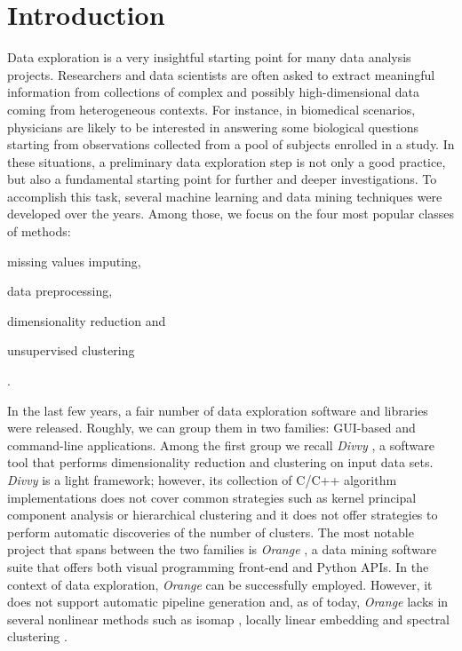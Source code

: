 \documentclass[twoside,11pt]{article}
\makeatletter
\newcommand{\py}{{Python}\@\xspace}
\makeatother
\begin{document}
\section{Introduction}\label{sec:intro}
Data exploration is a very insightful starting point for many data analysis projects. Researchers and data scientists are often asked to extract meaningful information from collections of complex and possibly high-dimensional data coming from heterogeneous contexts.
For instance, in biomedical scenarios, physicians are likely to be interested in answering some biological questions starting from observations collected from a pool of subjects enrolled in a study.
In these situations, a preliminary data exploration step is not only a good practice, but also a fundamental starting point for further and deeper investigations.
To accomplish this task, several machine learning and data mining techniques were developed over the years.
Among those, we focus on the four most popular classes of methods: \begin{enumerate*}[label=(\roman*)]
  \item missing values imputing,
  \item data preprocessing,
  \item dimensionality reduction and
  \item unsupervised clustering
\end{enumerate*}.

In the last few years, a fair number of data exploration software and libraries were released. Roughly, we can group them in two families: GUI-based and command-line applications.
Among the first group we recall \emph{Divvy} \citep{lewis2013divvy}, a software tool that performs dimensionality reduction and clustering on input data sets. \emph{Divvy} is a light framework; however,
its collection of {C/C++} algorithm implementations does not cover common strategies such as kernel principal component analysis \citep{scholkopf1997kernel} or hierarchical clustering \citep{friedman2001elements} and it does not offer strategies to perform automatic discoveries of the number of clusters.
The most notable project that spans between the two families is \emph{Orange} \citep{demvsar2013orange}, a data mining software suite that offers both visual programming front-end and \py APIs. In the context of data exploration, \emph{Orange} can be successfully employed. However, it does not support automatic pipeline generation
and, as of today, \emph{Orange} lacks in several nonlinear methods such as isomap \citep{tenenbaum2000global}, locally linear embedding \citep{roweis2000nonlinear} and spectral clustering \citep{shi2000normalized}.
\end{document}
